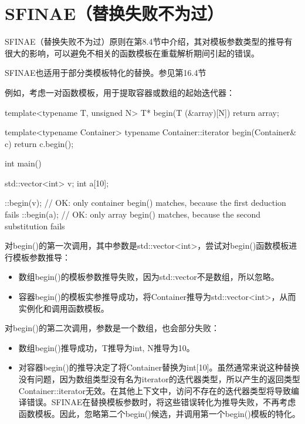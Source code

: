 \section{SFINAE（替换失败不为过）}


SFINAE（替换失败不为过）原则在第8.4节中介绍，其对模板参数类型的推导有很大的影响，可以避免不相关的函数模板在重载解析期间引起的错误。

\begin{notice}
SFINAE也适用于部分类模板特化的替换。参见第16.4节
\end{notice}

例如，考虑一对函数模板，用于提取容器或数组的起始迭代器：

\begin{cpp}
template<typename T, unsigned N>
T* begin(T (&array)[N]) {
	return array;
}

template<typename Container>
typename Container::iterator begin(Container& c) {
	return c.begin();
}

int main() {
	std::vector<int> v;
	int a[10];
	
	::begin(v); // OK: only container begin() matches, because the first deduction fails
	::begin(a); // OK: only array begin() matches, because the second substitution fails
}
\end{cpp}

对begin()的第一次调用，其中参数是std::vector<int>，尝试对begin()函数模板进行模板参数推导：

\begin{itemize}
\item 
数组begin()的模板参数推导失败，因为std::vector不是数组，所以忽略。

\item 
容器begin()的模板实参推导成功，将Container推导为std::vector<int>，从而实例化和调用函数模板。
\end{itemize}

对begin()的第二次调用，参数是一个数组，也会部分失败：

\begin{itemize}
\item 
数组begin()推导成功，T推导为int, N推导为10。

\item 
对容器begin()的推导决定了将Container替换为int[10]。虽然通常来说这种替换没有问题，因为数组类型没有名为iterator的迭代器类型，所以产生的返回类型Container::iterator无效。在其他上下文中，访问不存在的迭代器类型将导致编译错误。SFINAE在替换模板参数时，将这些错误转化为推导失败，不再考虑函数模板。因此，忽略第二个begin()候选，并调用第一个begin()模板的特化。
\end{itemize}

